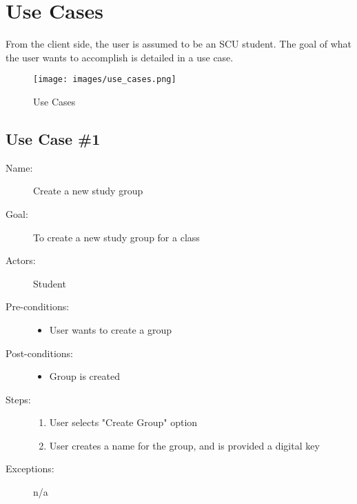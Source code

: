 \chapter{Use Cases}
From the client side, the user is assumed to be an SCU student. The goal of what the user wants to accomplish is detailed in a use case.

\begin{figure}[h]
	\centering
	\texttt{[image: images/use\_cases.png]}
	\caption{Use Cases}
	\label{fig:use cases}
\end{figure}

\section{Use Case \#1}
	\begin{description}
		\item[Name:] Create a new study group
		\item[Goal:] To create a new study group for a class
		\item[Actors:] Student
		\item[Pre-conditions:]
			\begin{itemize}
				\item User wants to create a group
			\end{itemize}
		\item[Post-conditions:]
			\begin{itemize}
				\item Group is created
			\end{itemize}
		\item[Steps:]
			\begin{enumerate}
				\item User selects "Create Group" option
				\item User creates a name for the group, and is provided a digital key
			\end{enumerate}
		\item[Exceptions:] n/a		
	\end{description}

